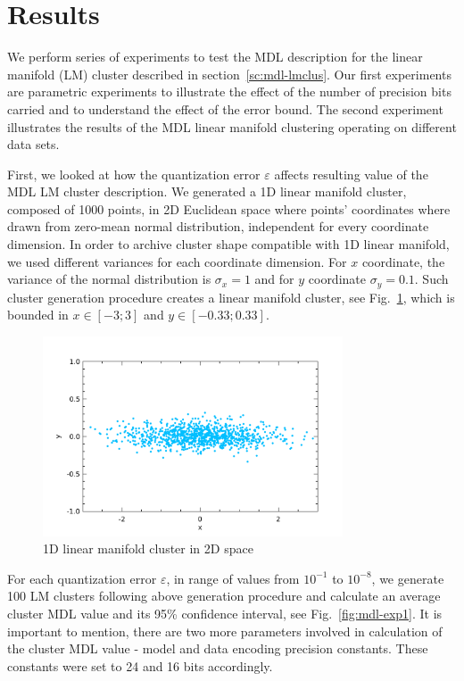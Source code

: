 \section{Results} \label{sc:results}

\ifIEEEtran
\else
We perform series of experiments to test the MDL description for the linear
manifold (LM) cluster described in section~\ref{sc:mdl-lmclus}.
Our first experiments are parametric experiments to illustrate the effect of
the number of precision bits carried and to understand the effect of
the error bound. The second experiment illustrates the results of the MDL linear
manifold clustering operating on different data sets.




First, we looked at how the quantization error $\varepsilon$ affects resulting
value of the MDL LM cluster description. We generated a 1D linear
manifold cluster, composed of 1000 points, in 2D Euclidean space where
points' coordinates where drawn from zero-mean normal distribution, independent
for every coordinate dimension.
In order to archive cluster shape compatible with 1D linear manifold, we used
different variances for each coordinate dimension. For $x$ coordinate,
the variance of the normal distribution is $\sigma_x = 1$ and for $y$ coordinate
$\sigma_y = 0.1$. Such cluster generation procedure creates a linear manifold
cluster, see Fig.~\ref{fig:lmc}, which is bounded in $x \in [-3;3]$ and
$y \in [-0.33;0.33]$.

\begin{figure}[ht]
\center
\includegraphics[width=3.5in]{img/results_lmc_1.pdf}
\caption{1D linear manifold cluster in 2D space}
\label{fig:lmc}
\end{figure}



For each quantization error $\varepsilon$, in range of values from $10^{-1}$ to
$10^{-8}$, we generate 100 LM clusters following above generation procedure and
calculate an average cluster MDL value and its 95\% confidence interval,
see Fig.~\ref{fig:mdl-exp1}. It is important to mention, there are two more
parameters involved in calculation of the cluster MDL value - model and data
encoding precision constants. These constants were set to 24 and 16 bits
accordingly.

